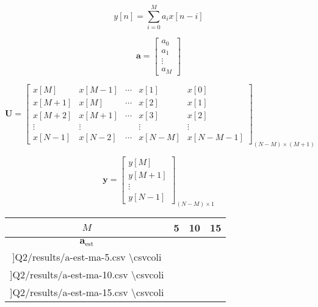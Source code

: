 \documentclass[12pt,onecolumn,a4paper]{article}
\begin{document}
\begin{equation}
	y[n] = \sum_{i=0}^M a_i x[n-i]
\end{equation}


\begin{equation}
	\bm{a} = \begin{bmatrix}  a_0 \\ a_1 \\ \vdots \\ a_M \end{bmatrix}
\end{equation}


\begin{equation}
	\bm{U} = 
	\begin{bmatrix}
		x[M] & x[M-1] & \cdots & x[1] & x[0] \\
		x[M+1] & x[M] & \cdots & x[2] & x[1] \\
		x[M+2] & x[M+1] & \cdots & x[3] & x[2] \\
		\vdots & \vdots &  & \vdots & \vdots \\
		x[N-1] & x[N-2] & \cdots & x[N-M] & x[N-M-1]
	\end{bmatrix}_{(N-M)\times(M+1)}
\end{equation}

\begin{equation}
	\bm{y} = 
	\begin{bmatrix}
		y[M] \\
		y[M+1] \\
		\vdots \\
		y[N-1]
	\end{bmatrix}_{(N-M)\times1}
\end{equation}



\begin{table}
\centering
\begin{LTR}
	\begin{tabular}{|c||c|c|c|}
		\hline
		\(M\)& 5 & 10 & 15 \\\hline
		\(	\bm{a}_\text{est} \) & 
		\(
		\begin{matrix}
			\csvreader[head=false, late after line=\\]{Q2/results/a-est-ma-5.csv}{}%
			{\num{\csvcoli}}
		\end{matrix}
		\) &
		\(
		\begin{matrix}
			\csvreader[head=false, late after line=\\]{Q2/results/a-est-ma-10.csv}{}%
			{\num{\csvcoli}}
		\end{matrix}
		\) & 
		\(
		\begin{matrix}
			\csvreader[head=false, late after line=\\]{Q2/results/a-est-ma-15.csv}{}%
			{\num{\csvcoli}}
		\end{matrix}
		\)
		\\\hline
	\end{tabular}
\end{LTR}
\end{table}
\end{document}
